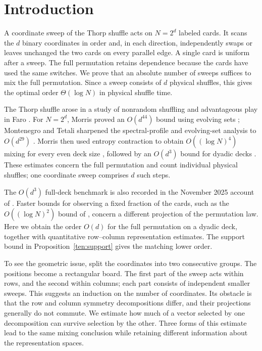 \section{Introduction}
A coordinate sweep of the Thorp shuffle acts on $N=2^d$ labeled cards.
It scans the $d$ binary coordinates in order and, in each direction,
independently swaps or leaves unchanged the two cards on every parallel edge.
A single card is uniform after a sweep. The full permutation retains
dependence because the cards have used the same switches. We prove that an
absolute number of sweeps suffices to mix the full permutation. Since a
sweep consists of $d$ physical shuffles, this gives the optimal order
$\Theta(\log N)$ in physical shuffle time.

The Thorp shuffle arose in a study of nonrandom shuffling and advantageous play in Faro \cite{Thorp1973}. For $N=2^d$, Morris proved an $O(d^{44})$ bound using evolving sets \cite{Morris2008}; Montenegro and Tetali sharpened the spectral-profile and evolving-set analysis to $O(d^{29})$ \cite[Section~6.4]{MontenegroTetali2006}. Morris then used entropy contraction to obtain $O((\log N)^4)$ mixing for every even deck size \cite{Morris2009}, followed by an $O(d^3)$ bound for dyadic decks \cite{Morris2013}. These estimates concern the full permutation and count individual physical shuffles; one coordinate sweep comprises $d$ such steps.

The $O(d^3)$ full-deck benchmark is also recorded in the November 2025 account of \citet[Section~1]{AlekseevEtAl2025}. Faster bounds for observing a fixed fraction of the cards, such as the $O((\log N)^2)$ bound of \citet{CzumajVocking2014}, concern a different projection of the permutation law. Here we obtain the order $O(d)$ for the full permutation on a dyadic deck, together with quantitative row--column representation estimates. The support bound in Proposition~\ref{ten:support} gives the matching lower order.

To see the geometric issue, split the coordinates into two consecutive
groups. The positions become a rectangular board. The first part of the
sweep acts within rows, and the second within columns; each part consists
of independent smaller sweeps. This suggests an induction on the number
of coordinates. Its obstacle is that the row and column symmetry
decompositions differ, and their projections generally do not commute.
We estimate how much of a vector selected by one decomposition can survive
selection by the other. Three forms of this estimate lead to the same
mixing conclusion while retaining different information about the
representation spaces.

